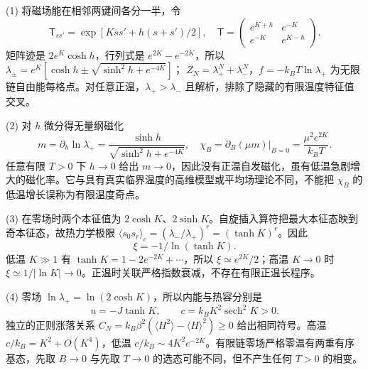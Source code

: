 (1) 将磁场能在相邻两键间各分一半，令
\[
\mathsf T_{ss'}=\exp[Kss'+h(s+s')/2],\quad
\mathsf T=\begin{pmatrix}e^{K+h}&e^{-K}\\e^{-K}&e^{K-h}\end{pmatrix}.
\]
矩阵迹是 \(2e^K\cosh h\)，行列式是 \(e^{2K}-e^{-2K}\)，所以
\(\lambda_\pm=e^K[\cosh h\pm\sqrt{\sinh^2h+e^{-4K}}]\)；
\(Z_N=\lambda_+^N+\lambda_-^N\)，\(f=-k_BT\ln\lambda_+\) 为无限链自由能每格点。对任意正温，\(\lambda_+>\lambda_-\) 且解析，排除了隐藏的有限温度特征值交叉。

(2) 对 \(h\) 微分得无量纲磁化
\[
m=\partial_h\ln\lambda_+
=\frac{\sinh h}{\sqrt{\sinh^2h+e^{-4K}}},
\quad \chi_B=\left.\partial_B(\mu m)\right|_{B=0}
=\frac{\mu^2e^{2K}}{k_BT}.
\]
任意有限 \(T>0\) 下 \(h\to0\) 给出 \(m\to0\)，因此没有正温自发磁化，虽有低温急剧增大的磁化率。它与具有真实临界温度的高维模型或平均场理论不同，不能把 \(\chi_B\) 的低温增长误称为有限温度奇点。

(3) 在零场时两个本征值为 \(2\cosh K\)、\(2\sinh K\)。自旋插入算符把最大本征态映到奇本征态，故热力学极限 \(\langle s_0s_r\rangle_c=(\lambda_-/\lambda_+)^r=(\tanh K)^r\)。因此
\[
\boxed{\xi=-1/\ln(\tanh K)}.
\]
低温 \(K\gg1\) 有 \(\tanh K=1-2e^{-2K}+\cdots\)，所以 \(\xi\simeq e^{2K}/2\)；高温 \(K\to0\) 时 \(\xi\simeq1/|\ln K|\to0\)。正温时关联严格指数衰减，不存在有限正温长程序。

(4) 零场 \(\ln\lambda_+=\ln(2\cosh K)\)，所以内能与热容分别是
\[
u=-J\tanh K,\qquad c=k_BK^2\operatorname{sech}^2K>0.
\]
独立的正则涨落关系 \(C_N=k_B\beta^2(\langle H^2\rangle-\langle H\rangle^2)\ge0\) 给出相同符号。高温 \(c/k_B=K^2+O(K^4)\)，低温 \(c/k_B\sim4K^2e^{-2K}\)。有限链零场严格零温有两重有序基态，先取 \(B\to0\) 与先取 \(T\to0\) 的选态可能不同，但不产生任何 \(T>0\) 的相变。
